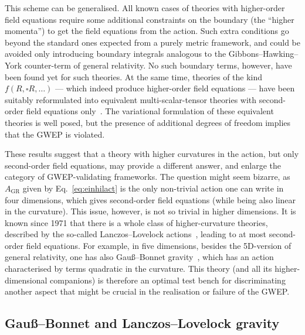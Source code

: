\documentclass[a4paper,showkeys,aps,prd,reprint,nofootinbib,showpacs,twocolumn]{revtex4-1}
\newcommand{\ton}[1]{\left(#1\right)}
\newcommand{\eq}[1]{\( #1 \)}
\theoremstyle{plain}
\begin{document}
This scheme can be generalised. All known cases of theories with higher-order field equations require some additional constraints on the boundary (the ``higher momenta'') to get the field equations from the action.  Such extra conditions go beyond the standard ones expected from a purely metric framework, and could be avoided only introducing  boundary integrals analogous to the Gibbons--Hawking--York counter-term of general relativity.  No such boundary terms, however, have been found yet for such theories.  At the same time, theories of the kind \eq{f\! \ton{R , \square R , \ldots}} --- which indeed produce higher-order field equations --- have been suitably reformulated into equivalent multi-scalar-tensor theories with second-order field equations only~\cite{Schmidt:1989zz,Gottlober:1989ww,Baykal:2013gfa}.  The variational formulation of these equivalent theories is well posed, but the presence of additional degrees of freedom implies that the GWEP is violated.

These results suggest that a theory with higher curvatures in the action, but only second-order field equations, may provide a different answer, and enlarge the category of GWEP-validating frameworks.  The question might seem bizarre, as \eq{A_{\text{GR}}} given by Eq.~\eqref{eq:einhilact} is the only non-trivial action one can write in four dimensions, which gives second-order field equations (while being also linear in the curvature).  This issue, however, is not so trivial in higher dimensions.  It is known since 1971 that there is a whole class of higher-curvature theories, described by the so-called Lanczos--Lovelock actions~\cite{Lovelock:1971yv}, leading to at most second-order field equations.  For example, in five dimensions, besides the 5D-version of general relativity, one has also Gau\ss{}--Bonnet gravity~\cite{Padmanabhan:2010zzb}, which has an action characterised by terms quadratic in the curvature.  This theory (and all its higher-dimensional companions) is therefore an optimal test bench for discriminating another aspect that might be crucial in the realisation or failure of the GWEP.


\subsection{Gau\ss{}--Bonnet and Lanczos--Lovelock gravity}
\label{ss:gaussbonnet}
\end{document}
